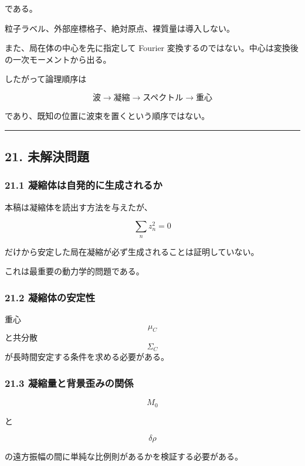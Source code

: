 \documentclass[
  a4paper,
]{ltjsarticle}
\begin{document}
である。

粒子ラベル、外部座標格子、絶対原点、裸質量は導入しない。

また、局在体の中心を先に指定して Fourier
変換するのではない。中心は変換後の一次モーメントから出る。

したがって論理順序は

\[
\boxed{
\text{波}
\rightarrow
\text{凝縮}
\rightarrow
\text{スペクトル}
\rightarrow
\text{重心}
}
\]

であり、既知の位置に波束を置くという順序ではない。

\begin{center}\rule{0.5\linewidth}{0.5pt}\end{center}

\subsection{21. 未解決問題}\label{ux672aux89e3ux6c7aux554fux984c}

\subsubsection{21.1
凝縮体は自発的に生成されるか}\label{ux51ddux7e2eux4f53ux306fux81eaux767aux7684ux306bux751fux6210ux3055ux308cux308bux304b}

本稿は凝縮体を読出す方法を与えたが、

\[
\sum_n z_n^2=0
\]

だけから安定した局在凝縮が必ず生成されることは証明していない。

これは最重要の動力学的問題である。

\subsubsection{21.2
凝縮体の安定性}\label{ux51ddux7e2eux4f53ux306eux5b89ux5b9aux6027}

重心 \[\mu_C\] と共分散 \[\Sigma_C\]
が長時間安定する条件を求める必要がある。

\subsubsection{21.3
凝縮量と背景歪みの関係}\label{ux51ddux7e2eux91cfux3068ux80ccux666fux6b6aux307fux306eux95a2ux4fc2}

\[
M_0
\]

と

\[
\delta\rho
\]

の遠方振幅の間に単純な比例則があるかを検証する必要がある。
\end{document}
